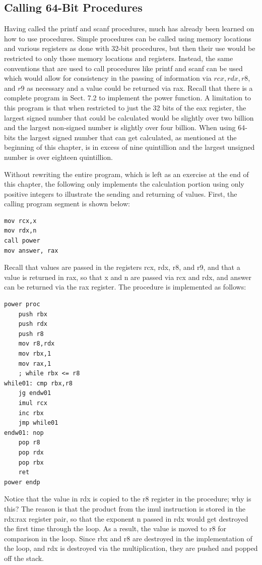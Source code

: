 \documentclass[10pt]{book}
\begin{document}
\subsection{Calling 64-Bit Procedures}
Having called the printf and scanf procedures, much has already been learned on how to use procedures. Simple procedures can be called using memory locations and various registers as done with 32-bit procedures, but then their use would be restricted to only those memory locations and registers. Instead, the same conventions that are used to call procedures like printf and scanf can be used which would allow for consistency in the passing of information via $r c x, r d x, r 8$, and $r 9$ as necessary and a value could be returned via rax.
Recall that there is a complete program in Sect. 7.2 to implement the power function. A limitation to this program is that when restricted to just the 32 bits of the eax register, the largest signed number that could be calculated would be slightly over two billion and the largest non-signed number is slightly over four billion. When using 64-bits the largest signed number that can get calculated, as mentioned at the beginning of this chapter, is in excess of nine quintillion and the largest unsigned number is over eighteen quintillion.

Without rewriting the entire program, which is left as an exercise at the end of this chapter, the following only implements the calculation portion using only positive integers to illustrate the sending and returning of values. First, the calling program segment is shown below:

\begin{verbatim}
mov rcx,x
mov rdx,n
call power
mov answer, rax
\end{verbatim}

Recall that values are passed in the registers rcx, rdx, r8, and r9, and that a value is returned in rax, so that x and n are passed via rcx and rdx, and answer can be returned via the rax register. The procedure is implemented as follows:

\begin{verbatim}
power proc
    push rbx
    push rdx
    push r8
    mov r8,rdx
    mov rbx,1
    mov rax,1
    ; while rbx <= r8
while01: cmp rbx,r8
    jg endw01
    imul rcx
    inc rbx
    jmp while01
endw01: nop
    pop r8
    pop rdx
    pop rbx
    ret
power endp
\end{verbatim}

Notice that the value in rdx is copied to the r8 register in the procedure; why is this? The reason is that the product from the imul instruction is stored in the rdx:rax register pair, so that the exponent n passed in rdx would get destroyed the first time through the loop. As a result, the value is moved to r8 for comparison in the loop. Since rbx and r8 are destroyed in the implementation of the loop, and rdx is destroyed via the multiplication, they are pushed and popped off the stack.
\end{document}
